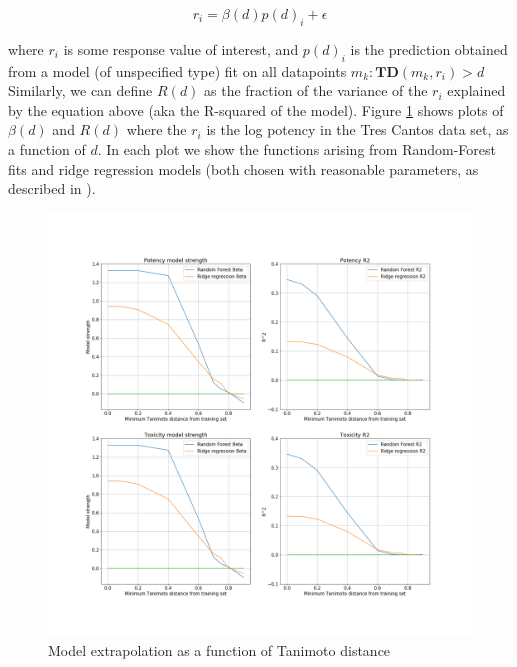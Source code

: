 \documentclass{article}
\begin{document}
\begin{equation}
    r_{i} = \beta(d) p(d)_{i} + \epsilon
\end{equation}

where $r_{i}$ is some response value of interest, and $p(d)_{i}$ is the prediction obtained from a model (of unspecified type) fit on all datapoints $m_{k} : \mathbf{TD}(m_{k}, r_{i}) > d$
\newline
\newline
Similarly, we can define $R(d)$ as the fraction of the variance  of the $r_{i}$ explained by the equation above  (aka the R-squared of the model).
\newline
\newline
Figure \ref{fig:model_extrap} shows plots of $\beta(d)$ and $R(d)$ where the $r_{i}$ is the log potency in the Tres Cantos data set, as a function of $d$.  In each plot we show the functions arising from Random-Forest fits and ridge regression models (both chosen with reasonable parameters, as described in \citep{et1:}).

\begin{figure}[h!]
\centering
\includegraphics[width=\textwidth, keepaspectratio]{fig4_str_r2.png}
\caption{Model extrapolation as a function of Tanimoto distance}
\label{fig:model_extrap}
\end{figure}
\end{document}
